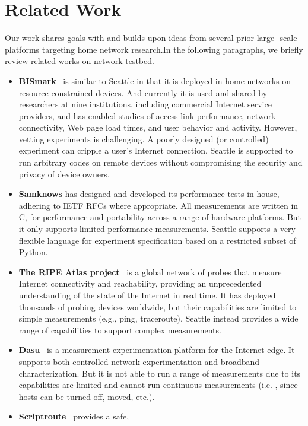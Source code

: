 \section{Related Work}
\label{sec.related_work}
Our work shares goals with and builds upon ideas from several prior large-
scale platforms targeting home network research.In the following paragraphs, 
we briefly review related works on network testbed. 
\begin{itemize}
\item \textbf{BISmark}~\cite{183951} is similar to Seattle in that it is 
deployed in home networks on resource-constrained devices. And currently it 
is used and shared by researchers at nine institutions, including commercial 
Internet service providers, and has enabled studies of access link 
performance, network connectivity, Web page load times, and user behavior 
and activity. However, vetting experiments is challenging. A poorly designed 
(or controlled) experiment can cripple a user's Internet connection. Seattle 
is supported to run arbitrary codes on remote devices without compromising 
the security and privacy of device owners.
\item \textbf{Samknows} has designed and developed its performance tests in 
house, adhering to IETF RFCs where appropriate. All measurements are written 
in C, for performance and portability across a range of hardware platforms. 
But it only supports limited performance measurements. Seattle supports a 
very flexible language for experiment specification based on a restricted 
subset of Python.
\item \textbf{The RIPE Atlas project}~\cite{bajpai2014lessons} is a global 
network of probes that measure Internet connectivity and reachability, 
providing an unprecedented understanding of the state of the Internet in 
real time. It has deployed thousands of probing devices worldwide, but their 
capabilities are limited to simple measurements (e.g., ping, traceroute). 
Seattle instead provides a wide range of capabilities to support complex 
measurements. 
\item \textbf{Dasu}~\cite{sanchez2014measurement} is a measurement 
experimentation platform for the Internet edge. It supports both controlled 
network experimentation and broadband characterization. But it is not able 
to run a range of measurements due to its capabilities are limited and 
cannot run continuous measurements (i.e. , since hosts can be turned off, 
moved, etc.).
\item \textbf{Scriptroute}~\cite{spring2003scriptroute} provides a safe, 

\end{itemize}
